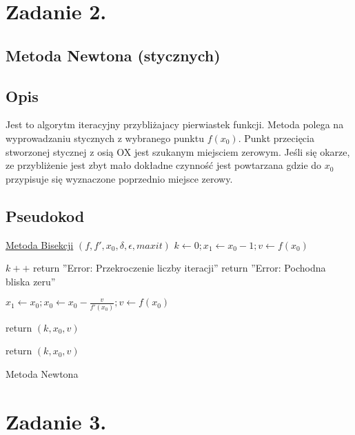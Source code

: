 \documentclass[11pt, a4paper]{article}
\begin{document}
    \section{Zadanie 2.}
    \subsection{Metoda Newtona (stycznych)}
    \subsection{Opis}
    Jest to algorytm iteracyjny przybliżajacy pierwiastek funkcji. Metoda polega na wyprowadzaniu stycznych z wybranego punktu $f(x_{0})$. Punkt przecięcia stworzonej stycznej z osią OX jest szukanym miejsciem zerowym. Jeśli się okarze, ze przybliżenie jest zbyt mało dokładne czynność jest powtarzana gdzie do $x_{0}$ przypisuje się wyznaczone poprzednio miejsce zerowy. 
    \subsection{Pseudokod}
    \begin{algorithm}[H]

        \underline{Metoda Bisekcji} $(f, f',x_{0}, \delta,\epsilon, maxit)$\;
        $k \leftarrow 0; x_{1} \leftarrow x_{0} - 1; v \leftarrow f(x_{0})$\;
        {
            $k++$\;
            {
                return ''Error: Przekroczenie liczby iteracji''\;
            }
            {
                return ''Error: Pochodna bliska zeru''\;
            }

            $x_{1} \leftarrow x_{0}; x_{0} \leftarrow x_{0} - \frac{v}{f'(x_{0})}; v \leftarrow f(x_{0})$\;

            {
                return $(k, x_{0}, v)$\;
            }
        }
        return $(k, x_{0}, v)$\;
        \caption{Metoda Newtona}
    \end{algorithm}
    \section{Zadanie 3.}
\end{document}
